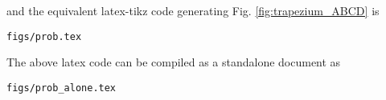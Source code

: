\begin{enumerate}[label=\thesection.\arabic*.,ref=\thesection.\theenumi]
%
and the equivalent latex-tikz code generating Fig. \ref{fig:trapezium_ABCD} is 
\begin{lstlisting}
figs/prob.tex
\end{lstlisting}
%
The above latex code can be compiled as a standalone document as
\begin{lstlisting}
figs/prob_alone.tex
\end{lstlisting}

%

\end{enumerate}
